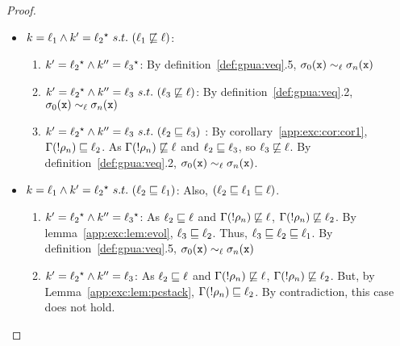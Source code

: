 \begin{proof}
\begin{itemize}
\item $k = \ell_1  \wedge k' = \ell_2 {}^\star  ~s.t.~ (\ell_1
  \not\sqsubseteq \ell)$: 
  \begin{enumerate}
  \item $k' =   \ell_2  {}^\star   \wedge k'' = \ell_3  {}^\star  $: By
    definition~\ref{def:gpua:veq}.5, $\sigma_0(\texttt{x}) \sim_\ell \sigma_n(\texttt{x})$ 
  \item  $k' =   \ell_2  {}^\star   \wedge k'' =
    \ell_3~s.t.~(\ell_3 \not\sqsubseteq \ell)$: By
    definition~\ref{def:gpua:veq}.2, $\sigma_0(\texttt{x}) \sim_\ell \sigma_n(\texttt{x})$ 
  \item  $k' =   \ell_2  {}^\star   \wedge k'' = \ell_3~s.t.~(\ell_2
    \sqsubseteq \ell_3)$ : By corollary~\ref{app:exc:cor:cor1}, 
    $\Gamma(!\rho_{n}) \sqsubseteq \ell_2$. As $\Gamma(!\rho_{n})
    \not\sqsubseteq  \ell$ and $\ell_2 \sqsubseteq \ell_3$, so $\ell_3 
    \not\sqsubseteq \ell$. By definition~\ref{def:gpua:veq}.2,
    $\sigma_0(\texttt{x}) \sim_\ell \sigma_n(\texttt{x})$.
  \end{enumerate}

\item $k = \ell_1  \wedge k' =  
  \ell_2 {}^\star  ~s.t.~ (\ell_2 \sqsubseteq \ell_1)$: Also,
  $(\ell_2 \sqsubseteq \ell_1 \sqsubseteq \ell)$.
  \begin{enumerate}
  \item $k' =   \ell_2  {}^\star   \wedge k'' = \ell_3  {}^\star  $: As $\ell_2
    \sqsubseteq \ell$ and $\Gamma(!\rho_n) \not\sqsubseteq \ell$,
    $\Gamma(!\rho_n) \not\sqsubseteq \ell_2$.  By
    lemma~\ref{app:exc:lem:evol}, $\ell_3 \sqsubseteq \ell_2 $. Thus, 
    $\ell_3\sqsubseteq \ell_2 \sqsubseteq \ell_1$. By
    definition~\ref{def:gpua:veq}.5, $\sigma_0(\texttt{x}) \sim_\ell
    \sigma_n(\texttt{x})$
  \item  $k' =   \ell_2  {}^\star   \wedge k'' = \ell_3$: As $\ell_2
    \sqsubseteq \ell$ and $\Gamma(!\rho_n) \not\sqsubseteq \ell$,
    $\Gamma(!\rho_n) \not\sqsubseteq \ell_2$. But, by
    Lemma~\ref{app:exc:lem:pcstack}, $\Gamma(!\rho_n) \sqsubseteq
    \ell_2$. By contradiction, this case does not hold.
  \end{enumerate}
\end{itemize}
\end{proof}


